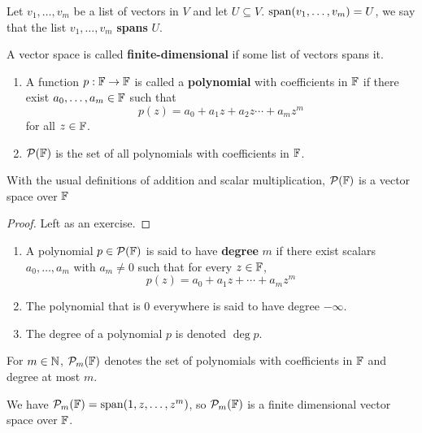 \begin{definition}[Spans]
    Let $v_1, \dots, v_m$ be a list of vectors in $V$ and let $U\subseteq V$. $\operatorname{span}(v_1, \dots, v_m) = U$, we say that the list $v_1, \dots, v_m$ \textbf{spans} $U$.
\end{definition}
\begin{definition}
    A vector space is called \textbf{finite-dimensional} if some list of vectors spans it.
\end{definition}
\begin{definition}[Polynomial]
    \begin{enumerate}
        \item A function $p: \mathbb F \to \mathbb F$ is called a \textbf{polynomial} with coefficients in $\mathbb F$ if there exist $a_0, \dots, a_m\in \mathbb F$ such that
        \[ p(z) = a_0 + a_1z + a_2z \cdots + a_mz^m \]
        for all $z\in\mathbb F$.
        \item $\mathcal{P}(\mathbb F)$ is the set of all polynomials with coefficients in $\mathbb F$.
    \end{enumerate}
\end{definition}
\begin{theorem}
    With the usual definitions of addition and scalar multiplication, $\mathcal{P}(\mathbb F)$ is a vector space over $\mathbb F$
\end{theorem}
\begin{proof}
    Left as an exercise.
\end{proof}
\begin{definition}
    \begin{enumerate}
        \item A polynomial $p\in\mathcal{P}(\mathbb F)$ is said to have \textbf{degree} $m$ if there exist scalars $a_0, \dots, a_m$ with $a_m \ne 0$ such that for every $z\in \mathbb F$,
        \[ p(z) = a_0 + a_1z + \cdots + a_mz^m\]
        \item The polynomial that is $0$ everywhere is said to have degree $-\infty$.
        \item The degree of a polynomial $p$ is denoted $\deg p$.
    \end{enumerate}
\end{definition}    
\begin{definition}
    For $m\in \mathbb{N}$, $\mathcal{P}_m(\mathbb F)$ denotes the set of polynomials with coefficients in $\mathbb F$ and degree at most $m$.
\end{definition}
We have $\mathcal{P}_m(\mathbb F) = \operatorname{span}(1, z, \dots, z^m)$, so $\mathcal{P}_m(\mathbb F)$ is a finite dimensional vector space over $\mathbb F$.
